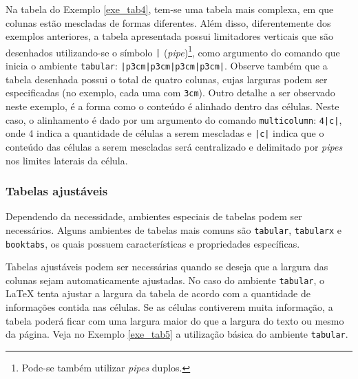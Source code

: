 Na tabela do Exemplo \ref{exe_tab4}, tem-se uma tabela mais complexa, em que colunas estão mescladas de formas diferentes. Além disso, diferentemente dos exemplos anteriores, a tabela apresentada possui limitadores verticais que são desenhados utilizando-se o símbolo {\tt |} (\textit{pipe})\footnote{Pode-se também utilizar \textit{pipes} duplos.}, como argumento do comando que inicia o ambiente \texttt{tabular}: {\tt |p{3cm}|p{3cm}|p{3cm}|p{3cm}|}. Observe também que a tabela desenhada possui o total de quatro colunas, cujas larguras podem ser especificadas (no exemplo, cada uma com {\tt 3cm}). Outro detalhe a ser observado neste exemplo, é a forma como o conteúdo é alinhado dentro das células. Neste caso, o alinhamento é dado por um argumento do comando \texttt{multicolumn}: \texttt{{4}{|c|}}, onde 4 indica a quantidade de células a serem mescladas e \texttt{|c|} indica que o conteúdo das células a serem mescladas será centralizado e delimitado por \textit{pipes} nos limites laterais da célula.

\subsubsection*{Tabelas ajustáveis}
\label{sec:amb_tabs}

Dependendo da necessidade, ambientes especiais de tabelas podem ser necessários. Alguns ambientes de tabelas mais comuns são {\tt tabular}, {\tt tabularx} e {\tt booktabs}, os quais possuem características e propriedades específicas.


Tabelas ajustáveis podem ser necessárias quando se deseja que a largura das colunas sejam automaticamente ajustadas. No caso do ambiente {\tt tabular}, o \LaTeX{} tenta ajustar a largura da tabela de acordo com a quantidade de informações contida nas células. Se as células contiverem muita informação, a tabela poderá ficar com uma largura maior do que a largura do texto ou mesmo da página. Veja no Exemplo \ref{exe_tab5} a utilização básica do ambiente {\tt tabular}.


